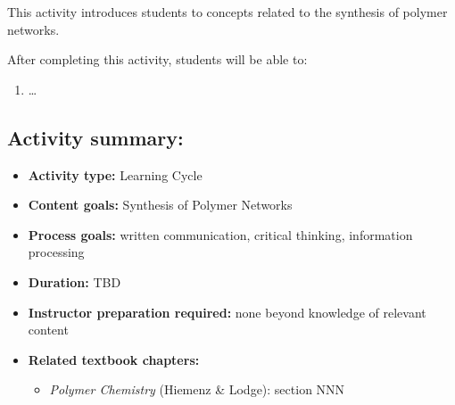 %
%
%
%

\renewcommand{\figpath}{content/polymchem/networks/network-synth/figs}
\renewcommand{\labelbase}{network-synth}

\begin{activity}

\begin{instructornotes}
	This activity introduces students to concepts related to the synthesis of polymer networks.
	
	After completing this activity, students will be able to:
	\begin{enumerate}
		\item \dots
	\end{enumerate}
	
	\subsection*{Activity summary:}
	\begin{itemize}
		\item \textbf{Activity type:} Learning Cycle
		\item \textbf{Content goals:} Synthesis of Polymer Networks
		\item \textbf{Process goals:} %
			written communication, critical thinking, information processing
		\item \textbf{Duration:} TBD
		\item \textbf{Instructor preparation required:} none beyond knowledge of relevant content
		\item \textbf{Related textbook chapters:}
			\begin{itemize}
				\item \emph{Polymer Chemistry} (Hiemenz \& Lodge): section NNN
			\end{itemize}
	\end{itemize}
	

\end{instructornotes}
\end{activity}
